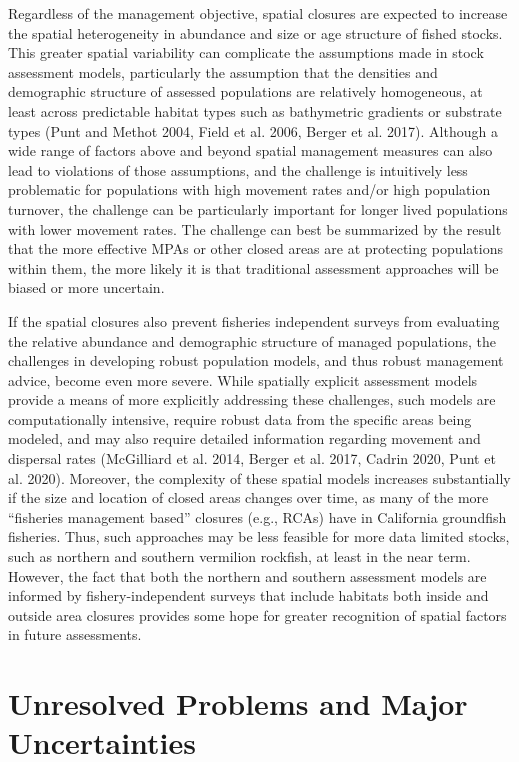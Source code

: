 \documentclass[
  english,
  a4paper,
]{article}
\begin{document}
Regardless of the management objective, spatial closures are expected to increase the spatial heterogeneity in abundance and size or age structure of fished stocks. This greater spatial variability can complicate the assumptions made in stock assessment models, particularly the assumption that the densities and demographic structure of assessed populations are relatively homogeneous, at least across predictable habitat types such as bathymetric gradients or substrate types (Punt and Methot 2004, Field et al. 2006, Berger et al. 2017). Although a wide range of factors above and beyond spatial management measures can also lead to violations of those assumptions, and the challenge is intuitively less problematic for populations with high movement rates and/or high population turnover, the challenge can be particularly important for longer lived populations with lower movement rates. The challenge can best be summarized by the result that the more effective MPAs or other closed areas are at protecting populations within them, the more likely it is that traditional assessment approaches will be biased or more uncertain.

If the spatial closures also prevent fisheries independent surveys from evaluating the relative abundance and demographic structure of managed populations, the challenges in developing robust population models, and thus robust management advice, become even more severe. While spatially explicit assessment models provide a means of more explicitly addressing these challenges, such models are computationally intensive, require robust data from the specific areas being modeled, and may also require detailed information regarding movement and dispersal rates (McGilliard et al. 2014, Berger et al. 2017, Cadrin 2020, Punt et al. 2020). Moreover, the complexity of these spatial models increases substantially if the size and location of closed areas changes over time, as many of the more ``fisheries management based'' closures (e.g., RCAs) have in California groundfish fisheries. Thus, such approaches may be less feasible for more data limited stocks, such as northern and southern vermilion rockfish, at least in the near term. However, the fact that both the northern and southern assessment models are informed by fishery-independent surveys that include habitats both inside and outside area closures provides some hope for greater recognition of spatial factors in future assessments.

\hypertarget{unresolved-problems-and-major-uncertainties-2}{%
\section{Unresolved Problems and Major Uncertainties}\label{unresolved-problems-and-major-uncertainties-2}}
\end{document}
